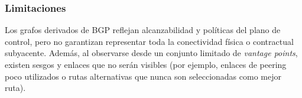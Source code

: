 \subsubsection{Limitaciones}

Los grafos derivados de BGP reflejan alcanzabilidad y políticas del plano de control, pero no garantizan representar toda la conectividad física o contractual subyacente. Además, al observarse desde un conjunto limitado de \textit{vantage points}, existen sesgos y enlaces que no serán visibles (por ejemplo, enlaces de peering poco utilizados o rutas alternativas que nunca son seleccionadas como mejor ruta).
